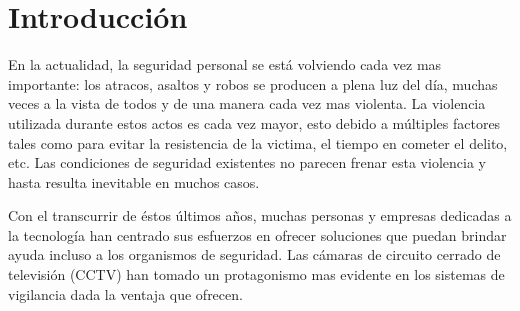 \documentclass[a4paper,12pt,oneside,spanish]{book}
\begin{document}
\section{Introducción}
En la actualidad, la seguridad personal se está volviendo cada vez mas importante: los atracos, asaltos y robos se producen a plena luz del día, muchas veces a la vista de todos y de una manera cada vez mas violenta. La violencia utilizada durante estos actos es cada vez mayor, esto debido a múltiples factores tales como para evitar la resistencia de la victima, el tiempo en cometer el delito, etc. Las condiciones de seguridad existentes no parecen frenar esta violencia y hasta resulta inevitable en muchos casos. \par
Con el transcurrir de éstos últimos años, muchas personas y empresas dedicadas a la tecnología han centrado sus esfuerzos en ofrecer soluciones que puedan brindar ayuda incluso a los organismos de seguridad. Las cámaras de circuito cerrado de televisión (CCTV) han tomado un protagonismo mas evidente en los sistemas de vigilancia dada la ventaja que ofrecen. \par
\end{document}

